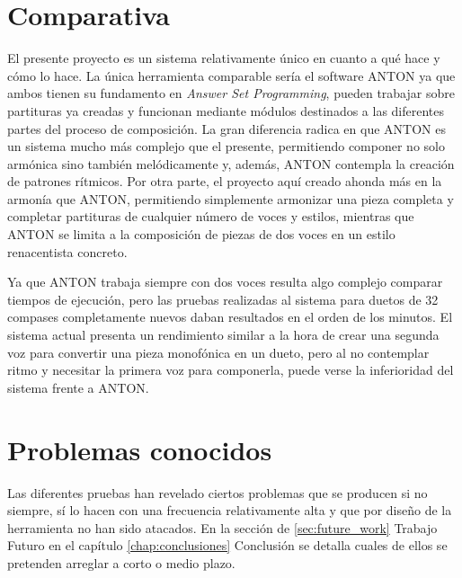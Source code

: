 \section{Comparativa}
El presente proyecto es un sistema relativamente único en cuanto a qué hace y cómo lo hace. La única herramienta comparable sería el software ANTON \cite{anton-composing} ya que ambos tienen su fundamento en \textit{Answer Set Programming}, pueden trabajar sobre partituras ya creadas y funcionan mediante módulos destinados a las diferentes partes del proceso de composición. La gran diferencia radica en que ANTON es un sistema mucho más complejo que el presente, permitiendo componer no solo armónica sino también melódicamente y, además, ANTON contempla la creación de patrones rítmicos. Por otra parte, el proyecto aquí creado ahonda más en la armonía que ANTON, permitiendo simplemente armonizar una pieza completa y completar partituras de cualquier número de voces y estilos, mientras que ANTON se limita a la composición de piezas de dos voces en un estilo renacentista concreto.

Ya que ANTON trabaja siempre con dos voces resulta algo complejo comparar tiempos de ejecución, pero las pruebas realizadas al sistema para duetos de 32 compases completamente nuevos daban resultados en el orden de los minutos. El sistema actual presenta un rendimiento similar a la hora de crear una segunda voz para convertir una pieza monofónica en un dueto, pero al no contemplar ritmo y necesitar la primera voz para componerla, puede verse la inferioridad del sistema frente a ANTON.

  \section{Problemas conocidos}
  \label{sec:known_issues}
  Las diferentes pruebas han revelado ciertos problemas que se producen si no siempre, sí lo hacen con una frecuencia relativamente alta y que por diseño de la herramienta no han sido atacados. En la sección de \ref{sec:future_work} Trabajo Futuro en el capítulo \ref{chap:conclusiones} Conclusión se detalla cuales de ellos se pretenden arreglar a corto o medio plazo.
  
